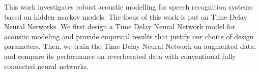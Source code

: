 
\abstract
This work investigates robust acoustic modelling for speech recognition systems based on hidden markov models. The focus of this work is put on Time Delay Neural Networks. We first design a Time Delay Neural Network model for acoustic modeling and provide empirical results that justify our choice of design parameters. Then, we train the Time Delay Neural Network on augmented data, and compare its performance on reverberated data with conventional fully connected neural networks.